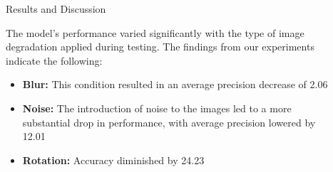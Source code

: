 \documentclass[final]{beamer}
\newlength{\sepwidth}
\newlength{\colwidth}
\newcommand{\separatorcolumn}{\begin{column}{\sepwidth}\end{column}}
\begin{document}
\begin{frame}[t]
\begin{columns}[t]
\begin{column}{\colwidth}
\end{column}

\separatorcolumn

\begin{column}{\colwidth}
    \begin{block}{Results and Discussion}
        \vspace{0.5cm} %

    The model’s performance varied significantly with the type of image degradation applied during testing. The findings from our experiments indicate the following:

\begin{itemize}
      \item \textbf{Blur:} This condition resulted in an average precision decrease of 2.06%

      \item \textbf{Noise:} The introduction of noise to the images led to a more substantial drop in performance, with average precision lowered by 12.01%

      \item \textbf{Rotation:} Accuracy diminished by 24.23%
\end{itemize}


\end{block}
\end{column}
\end{columns}
\end{frame}
\end{document}
